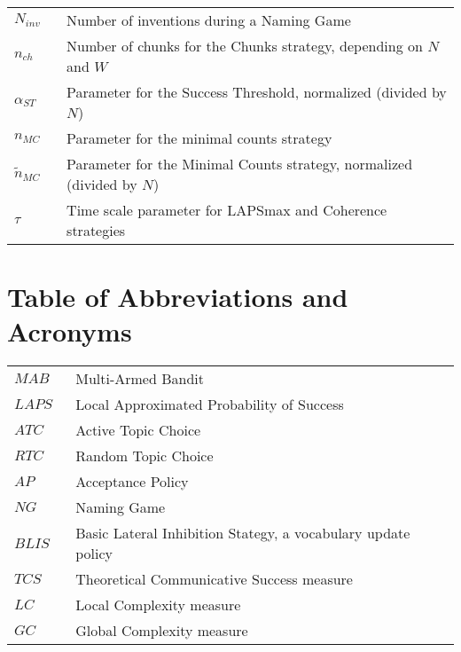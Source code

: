 \begin{table*}
\begin{tabular}{ll}
$N_{inv}\;\;\;$ & Number of inventions during a Naming Game\\
$n_{ch}\;\;\;$ & Number of chunks for the Chunks strategy, depending on $N$ and $W$\\
$\alpha_{ST}\;\;\;$ & Parameter for the Success Threshold, normalized (divided by $N$)\\
$n_{MC}\;\;\;$ & Parameter for the minimal counts strategy\\
$\widetilde{n}_{MC}\;\;\;$ & Parameter for the Minimal Counts strategy, normalized (divided by $N$)\\
$\tau\;\;\;$ & Time scale parameter for LAPSmax and Coherence strategies\\


\end{tabular}
\caption[Table of symbols]{}
\label{tab:symbols}
\end{table*}

\clearpage
\section*{Table of Abbreviations and Acronyms}
\begin{table*}

\begin{tabular}{ll}

$MAB$ & Multi-Armed Bandit\\
$LAPS$ & Local Approximated Probability of Success\\
$ATC\;\;\;$  & Active Topic Choice\\
$RTC\;\;\;$  & Random Topic Choice\\
$AP\;\;\;$  & Acceptance Policy\\
$NG\;\;\;$ & Naming Game\\
$BLIS\;\;\;$ & Basic Lateral Inhibition Stategy, a vocabulary update policy\\
$TCS\;\;\;$ & Theoretical Communicative Success measure\\
$LC\;\;\;$ & Local Complexity measure\\
$GC\;\;\;$ & Global Complexity measure\\

\end{tabular}
\caption[Table of abbreviations and acronyms]{}
\label{tab:acronyms}
\end{table*}
